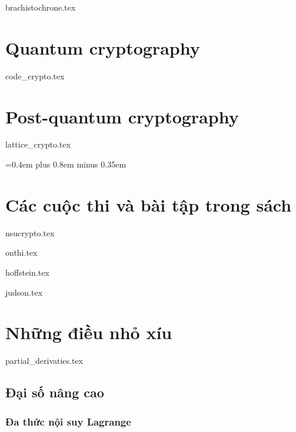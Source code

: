 \documentclass{mynotes}
\begin{document}




{brachistochrone.tex}



\part{Quantum cryptography}

\parttoc



{code_crypto.tex}

\part{Post-quantum cryptography}

\parttoc

{lattice_crypto.tex}

{
 \spaceskip=0.4em plus 0.8em minus 0.35em
\printbibliography[env=gostbibliography,heading=bibintoc,title={Tài liệu tham khảo}]
}


\part{Các cuộc thi và bài tập trong sách}

\parttoc

{nsucrypto.tex}

{onthi.tex}

{hoffstein.tex}

{judson.tex}

\part{Những điều nhỏ xíu}

\parttoc

{partial_derivaties.tex}

\chapter{Đại số nâng cao}

\section{Đa thức nội suy Lagrange}
\end{document}
